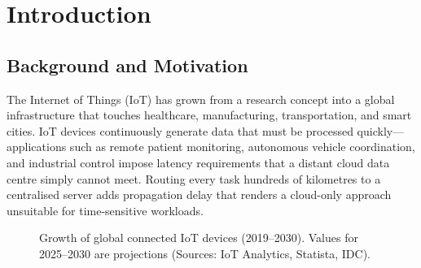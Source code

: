\chapter{Introduction}
\label{chap:intro}

\section{Background and Motivation}
\label{sec:background}

The Internet of Things (IoT) has grown from a research concept into
a global infrastructure that touches healthcare, manufacturing,
transportation, and smart cities. IoT devices continuously generate
data that must be processed quickly---applications such as remote
patient monitoring, autonomous vehicle coordination, and industrial
control impose latency requirements that a distant cloud data centre
simply cannot meet. Routing every task hundreds of kilometres to a
centralised server adds propagation delay that renders a cloud-only
approach unsuitable for time-sensitive workloads.

\begin{figure}[htbp]
\centering
{}
\caption{Growth of global connected IoT devices (2019--2030).
         Values for 2025--2030 are projections
         (Sources: IoT Analytics, Statista, IDC).}
\label{fig:iot_growth}
\end{figure}

